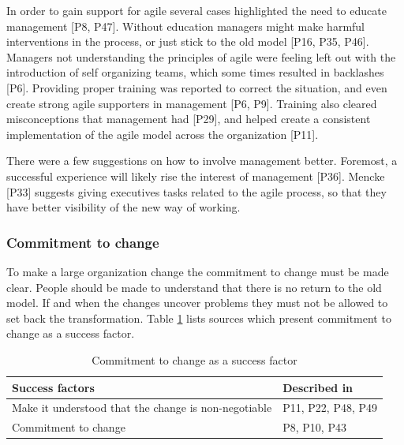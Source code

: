 
In order to gain support for agile several cases highlighted the need to educate
management [P8, P47].
Without education managers might make harmful interventions in the process, or
just stick to the old model [P16, P35, P46].
Managers not understanding the principles of agile were feeling left out with
the introduction of self organizing teams, which some times resulted in
backlashes [P6]. Providing proper training was reported to correct the
situation, and even create strong agile supporters in management [P6, P9].
Training also cleared misconceptions that management had [P29], and helped
create a consistent implementation of the agile model across the organization
[P11].

There were a few suggestions on how to involve management better. Foremost, a
successful experience will likely rise the interest of management [P36].
Mencke [P33] suggests giving executives tasks related to the agile process,
so that they have better visibility of the new way of working. 


\subsubsection{Commitment to change}

To make a large organization change the commitment to change must be made clear.
People should be made to understand that there is no return to the old model.
If and when the changes uncover problems they must not be allowed to set back
the transformation. Table \ref{table:success_commitment} lists sources which
present commitment to change as a success factor.

\begin{table}[h]
    \centering
    \begin{tabular}{ >{\raggedright\arraybackslash}p{}
                     >{\raggedright\arraybackslash}p{} }
        \toprule
        Success factors  &  Described in \\
        \midrule
        Make it understood that the change is non-negotiable  &
                P11, P22, P48, P49  \\
        Commitment to change  &
                P8, P10, P43  \\
        \bottomrule
    \end{tabular}
    \caption{Commitment to change as a success factor}
    \label{table:success_commitment}
\end{table}

